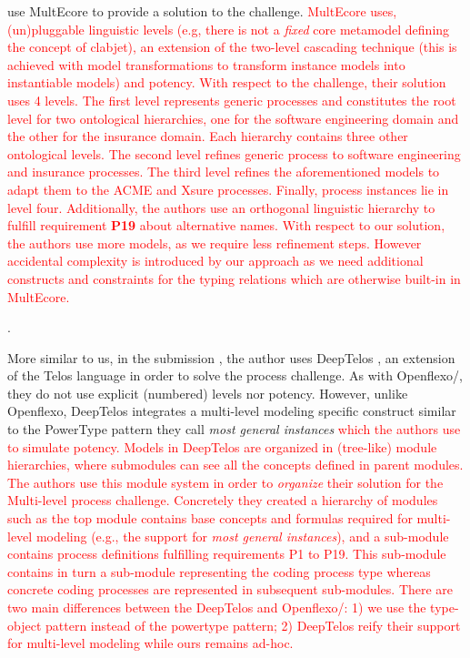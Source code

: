 \cite{multiecore2019} use MultEcore \citep{multecore2016} to provide a solution to the challenge. \textcolor{red}{MultEcore uses, (un)pluggable linguistic levels (e.g, there is not a \emph{fixed} core metamodel defining the concept of clabjet), an extension of the two-level cascading technique \citep{atkinson2005concepts} (this is achieved with model transformations to transform instance models into instantiable models) and potency. With respect to the challenge, their solution uses 4 levels. The first level represents generic processes and constitutes the root level for two ontological hierarchies, one for the software engineering domain and the other for the insurance domain. Each hierarchy contains three other ontological levels. The second level refines generic process to software engineering and insurance processes. The third level refines the aforementioned models to adapt them to the ACME and Xsure processes. Finally, process instances lie in level four. Additionally, the authors use an orthogonal linguistic hierarchy to fulfill requirement \textbf{P19} about alternative names. With respect to our solution, the authors use more models, as we require less refinement steps. However accidental complexity is introduced by our approach as we need additional constructs and constraints for the typing relations which are otherwise built-in in MultEcore.} 

.



More similar to us, in the submission \parencite{deeptelos2019}, the author uses DeepTelos \parencite{deeptelos2016}, an extension of the Telos language \parencite{telos1990} in order to solve the process challenge. As with Openflexo/\FML, they do not use explicit (numbered) levels nor potency. However, unlike Openflexo, DeepTelos integrates a multi-level modeling specific construct similar to the PowerType \parencite{atkinson2001essence} pattern they call \emph{most general instances} \textcolor{red}{which the authors use to simulate potency. Models in DeepTelos are organized in (tree-like) module hierarchies, where submodules can see all the concepts defined in parent modules. The authors use this module system in order to \emph{organize} their solution for the Multi-level process challenge. Concretely they created a hierarchy of modules such as the top module contains base concepts and formulas required for multi-level modeling (e.g., the support for \emph{most general instances}), and a sub-module contains process definitions fulfilling requirements P1 to P19. This sub-module contains in turn a sub-module representing the coding process type whereas concrete coding processes are represented in subsequent sub-modules. There are two main differences between the DeepTelos and Openflexo/\FML: 1) we use the type-object pattern instead of the powertype pattern; 2) DeepTelos reify their support for multi-level modeling while ours remains ad-hoc.}

